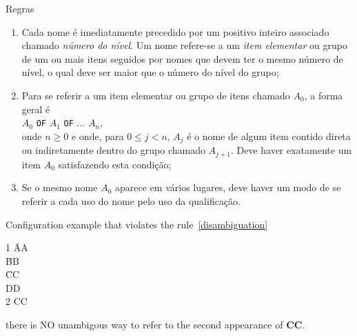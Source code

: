 \begin{frame}{Regras}
\begin{enumerate}
\item<1-> Cada nome é imediatamente precedido por um positivo inteiro
associado chamado {\em número do nível}. Um nome refere-se a um
{\em item elementar} ou grupo de um ou mais itens seguidos por
nomes que devem ter o mesmo número de nível, o qual deve ser maior que
o número do nível do grupo;
\item<2-> Para se referir a um item elementar ou grupo de itens chamado
$A_0$, a forma geral é\\
\hfil $A_0$ {\tt OF} $A_1$ {\tt OF} $\dots$ $A_n$,\hfil\\
\noindent onde $n \geq 0$ e onde, para $0 \leq j < n$, $A_j$ é o
nome de algum item contido direta ou indiretamente dentro do grupo
chamado $A_{j+1}$. Deve haver exatamente um item $A_0$ satisfazendo
esta condição;
\item<3> Se o mesmo nome $A_0$ aparece em vários lugares, deve haver um
modo de se referir a cada uso do nome pelo uso da qualificação.\label{disambiguation}
\end{enumerate}
\end{frame}

Configuration example that violates the rule~\ref{disambiguation}\\
\begin{center}
\begin{tabbing}
1 \=AA\\
  \= BB\\
  \> \=CC\\
  \>\> DD\\
  2\>\> CC\\
\end{tabbing}
\end{center}

there is NO unambigous way to refer to the second appearance of {\bf CC}.

